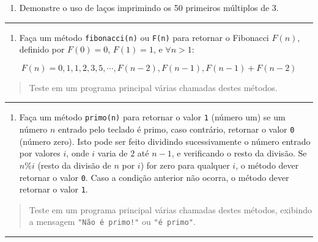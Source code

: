 \documentclass[12pt,a4paper]{article}
\providecommand{\tightlist}{%
      \setlength{\itemsep}{0pt}\setlength{\parskip}{0pt}}
\begin{document}
\begin{enumerate}
\def\labelenumi{\arabic{enumi}.}
\tightlist
\item
  Demonstre o uso de laços imprimindo os 50 primeiros múltiplos de 3.
\end{enumerate}

    \begin{center}\rule{0.5\linewidth}{0.5pt}\end{center}

\begin{enumerate}
\def\labelenumi{\arabic{enumi}.}
\setcounter{enumi}{1}
\tightlist
\item
  Faça um método \texttt{fibonacci(n)} ou \texttt{F(n)} para retornar o
  Fibonacci \(F(n)\), definido por \(F(0)=0\), \(F(1)=1\), e
  \(\forall n>1\):
\end{enumerate}

\[F(n) = 0, 1, 1, 2, 3, 5, \cdots, F(n-2), F(n-1), F(n-1) + F(n-2) \]

\begin{quote}
Teste em um programa principal várias chamadas destes métodos.
\end{quote}

    \begin{center}\rule{0.5\linewidth}{0.5pt}\end{center}

\begin{enumerate}
\def\labelenumi{\arabic{enumi}.}
\setcounter{enumi}{2}
\tightlist
\item
  Faça um método \texttt{primo(n)} para retornar o valor \texttt{1}
  (número um) se um número \(n\) entrado pelo teclado é primo, caso
  contrário, retornar o valor \texttt{0} (número zero). Isto pode ser
  feito dividindo sucessivamente o número entrado por valores \(i\),
  onde \(i\) varia de \(2\) até \(n-1\), e verificando o resto da
  divisão. Se \(n\%i\) (resto da divisão de \(n\) por \(i\)) for zero
  para qualquer \(i\), o método dever retornar o valor \texttt{0}. Caso
  a condição anterior não ocorra, o método dever retornar o valor
  \texttt{1}.
\end{enumerate}

\begin{quote}
Teste em um programa principal várias chamadas destes métodos, exibindo
a mensagem \texttt{"Não\ é\ primo!"} ou \texttt{"é\ primo"}.
\end{quote}

    \begin{center}\rule{0.5\linewidth}{0.5pt}\end{center}
\end{document}
